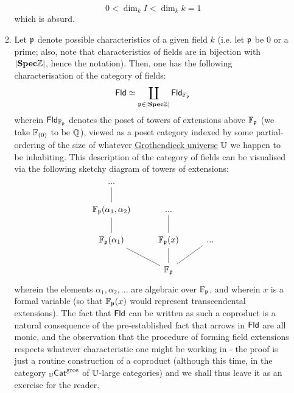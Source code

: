 \begin{example}
\begin{enumerate}
\begin{enumerate}
                                        $$0 < \dim_k I < \dim_k k = 1$$
                                    which is absurd.
                                    \item Let $\mathfrak{p}$ denote possible characteristics of a given field $k$ (i.e. let $\mathfrak{p}$ be $0$ or a prime; also, note that characteristics of fields are in bijection with $|\mathbf{Spec} \mathbb{Z}|$, hence the notation). Then, one has the following characterisation of the category of fields:
                                        $$\mathsf{Fld} \simeq \coprod_{\mathfrak{p} \in |\mathbf{Spec} \mathbb{Z}|} \mathsf{Fld}_{\mathbb{F}_{\mathfrak{p}}}$$
                                    wherein $\mathsf{Fld}_{\mathbb{F}_{\mathfrak{p}}}$ denotes the poset of towers of extensions above $\mathbb{F}_{\mathfrak{p}}$ (we take $\mathbb{F}_{(0)}$ to be $\mathbb{Q}$), viewed as a poset category indexed by some partial-ordering of the size of whatever \href{https://ncatlab.org/nlab/show/Grothendieck+universe}{\underline{Grothendieck universe}} $\mathbb{U}$ we happen to be inhabiting. This description of the category of fields can be visualised via the following sketchy diagram of towers of extensions:
                                        $$
                                            \begin{tikzcd}
                                            	{...} \\
                                            	{\F_{\p}(\alpha_1, \alpha_2)} & {...} \\
                                            	{\F_{\p}(\alpha_1)} & {\F_{\p}(x)} & {...} \\
                                            	& {\F_{\p}}
                                            	\arrow[no head, from=2-1, to=1-1]
                                            	\arrow[no head, from=3-1, to=2-1]
                                            	\arrow[no head, from=4-2, to=3-1]
                                            	\arrow[no head, from=4-2, to=3-2]
                                            	\arrow[no head, from=4-2, to=3-3]
                                            	\arrow[no head, from=3-2, to=2-2]
                                            \end{tikzcd}
                                        $$
                                    wherein the elements $\alpha_1, \alpha_2, ...$ are algebraic over $\mathbb{F}_{\mathfrak{p}}$, and wherein $x$ is a formal variable (so that $\mathbb{F}_{\mathfrak{p}}(x)$ would represent transcendental extensions). The fact that $\mathsf{Fld}$ can be written as such a coproduct is a natural consequence of the pre-established fact that arrows in $\mathsf{Fld}$ are all monic, and the observation that the procedure of forming field extensions respects whatever characteristic one might be working in - the proof is just a routine construction of a coproduct (although this time, in the category ${}_{\mathbb{U}}\mathsf{Cat}^{\mathrm{gros}}$ of $\mathbb{U}$-large categories) and we shall thus leave it as an exercise for the reader. 

\end{enumerate}
\end{enumerate}
\end{example}
